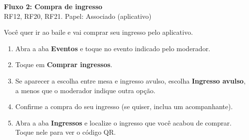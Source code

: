 \documentclass[11pt,a4paper]{article}
\begin{document}
\begin{center}
  {\LARGE\bfseries\color{brandgreen} Fluxo 2: Compra de ingresso}\\[1mm]
  {\large RF12, RF20, RF21. Papel: Associado (aplicativo)}
\end{center}

\vspace{2mm}
Você quer ir ao baile e vai comprar seu ingresso pelo aplicativo.

\begin{enumerate}[leftmargin=6mm]
  \item Abra a aba \textbf{Eventos} e toque no evento indicado pelo moderador.
  \item Toque em \textbf{Comprar ingressos}.
  \item Se aparecer a escolha entre mesa e ingresso avulso, escolha \textbf{Ingresso avulso}, a
    menos que o moderador indique outra opção.
  \item Confirme a compra do seu ingresso (se quiser, inclua um acompanhante).
  \item Abra a aba \textbf{Ingressos} e localize o ingresso que você acabou de comprar. Toque nele
    para ver o código QR.
\end{enumerate}
\end{document}
